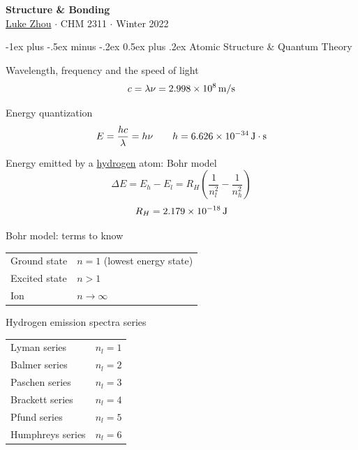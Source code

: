 \documentclass[10pt,landscape]{article}
\makeatletter
\renewcommand{\section}{\@startsection{section}{1}{0mm}%
                                {-1ex plus -.5ex minus -.2ex}%
                                {0.5ex plus .2ex}%
                                {\normalfont\large\bfseries}}
\newcommand{\extraline}{\vspace{1em}}
\newcommand{\halfline}{\vspace{0.5em}}
\newcommand{\tableindent}{\hspace{1.5em}}
\makeatother
\begin{document}
\raggedright
\footnotesize
\begin{multicols}{3}

\setlength{\premulticols}{1pt}
\setlength{\postmulticols}{1pt}
\setlength{\multicolsep}{1pt}
\setlength{\columnsep}{2pt}

\begin{center}
     \Large{\textbf{Structure \& Bonding}} \\
     \small{\href{https://github.com/zhouluke/PhysicsFormulas}{Luke Zhou} $\cdot$ CHM 2311 $\cdot$ Winter 2022}
\end{center}

\section{Atomic Structure \& Quantum Theory}

Wavelength, frequency and the speed of light
\[ c = \lambda\nu  = \SI{2.998E8}{\meter/\second}  \]

Energy quantization
\[E = \frac{hc}{\lambda} = h\nu  \qquad
 h = \SI{6.626E-34}{\joule\cdot\second}  \]

Energy emitted by a \underline{hydrogen} atom: Bohr model
 \[ \Delta E = E_{h} - E_{l} = R_H \left(  \frac{1}{n_l^2} - \frac{1}{n_h^2} \right) \] 
 \[ R_H =  \SI{2.179E-18}{\joule} \]

Bohr model: terms to know \\
\halfline
\begin{tabular}{@{\tableindent}ll@{}}
	Ground state & $n = 1$ (lowest energy state) \\
	Excited state & $n>1$ \\
	Ion  & $n \to \infty$ \\
\end{tabular}
\extraline


Hydrogen emission spectra series \\
\begin{tabular}{@{\tableindent}ll@{}}
	Lyman series & $n_l = 1$ \\
	Balmer series & $n_l = 2$ \\
	Paschen series & $n_l = 3$ \\
	Brackett series & $n_l = 4$ \\
	Pfund series & $n_l = 5$ \\
	Humphreys series & $n_l = 6$ \\
\end{tabular}
\extraline


\end{multicols}
\end{document}
